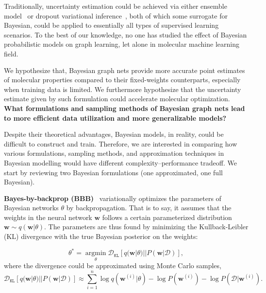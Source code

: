 \documentclass[11pt]{article}
\begin{document}
Traditionally, uncertainty estimation could be achieved via either ensemble model~\cite{dietterich2000ensemble} or dropout variational inference~\cite{gal2016dropout}, both of which some surrogate for Bayesian, could be applied to essentially all types of supervised learning scenarios. To the best of our knowledge, no one has studied the effect of Bayesian probabilistic models on graph learning, let alone in molecular machine learning field.

We hypothesize that, Bayesian graph nets provide more accurate point estimates of molecular properties compared to their fixed-weights counterparts, especially when training data is limited. We furthermore hypothesize that the uncertainty estimate given by such formulation could accelerate molecular optimization.\\

\noindent\textbf{What formulations and sampling methods of Bayesian graph nets lead to more efficient data utilization and more generalizable models?}

Despite their theoretical advantages, Bayesian models, in reality, could be difficult to construct and train. Therefore, we are interested in comparing how various formulations, sampling methods, and approximation techniques in Bayesian modelling would have different complexity--performance tradeoff. We start by reviewing two Bayesian formulations (one approximated, one full Bayesian).

\textbf{Bayes-by-backprop (BBB)}~\cite{blundell2015weight} variationally optimizes the parameters of Bayesian networks $\theta$ by backpropagation. That is to say, it assumes that the weights in the neural network $\mathbf{w}$ follows a certain parameterized distribution $\mathbf{w} \sim q(\mathbf{w} | \theta)$. The parameters are thus found by minimizing the Kullback-Leibler (KL) divergence with the true Bayesian posterior on the weights:

\begin{equation}
\theta^* = \underset{\theta}{\operatorname{argmin}}\mathcal{D}_\mathtt{KL}[q(\mathbf{w} | \theta) || P(\mathbf{w}|\mathcal{D})],
\end{equation}where the divergence could be approximated using Monte Carlo samples,
\begin{equation}
\mathcal{D}_\mathtt{KL}[q(\mathbf{w} | \theta) || P(\mathbf{w}|\mathcal{D})] \approx \sum\limits_{i=1}^n \log q(\textbf{w}^{(i)}|\theta) - \log P(\textbf{w}^{(i)}) - \log P(\mathcal{D} | \mathbf{w}^{(i)}).
\end{equation}
\end{document}
